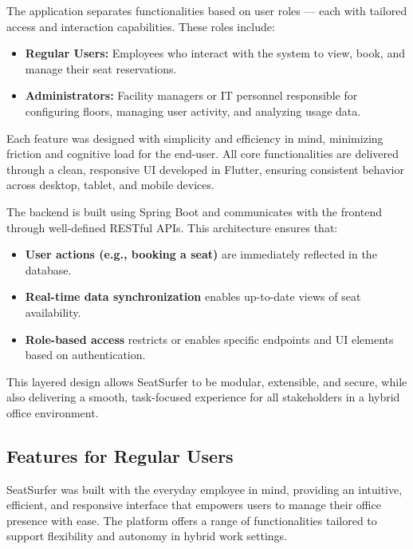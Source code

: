 \documentclass[12pt,a4paper]{report} %
\begin{document}
The application separates functionalities based on user roles — each with tailored access and interaction capabilities. These roles include:

\begin{itemize}
    \item \textbf{Regular Users:} Employees who interact with the system to view, book, and manage their seat reservations.
    \item \textbf{Administrators:} Facility managers or IT personnel responsible for configuring floors, managing user activity, and analyzing usage data.
\end{itemize}

Each feature was designed with simplicity and efficiency in mind, minimizing friction and cognitive load for the end-user. All core functionalities are delivered through a clean, responsive UI developed in Flutter, ensuring consistent behavior across desktop, tablet, and mobile devices.

The backend is built using Spring Boot and communicates with the frontend through well-defined RESTful APIs. This architecture ensures that:

\begin{itemize}
    \item \textbf{User actions (e.g., booking a seat)} are immediately reflected in the database.
    \item \textbf{Real-time data synchronization} enables up-to-date views of seat availability.
    \item \textbf{Role-based access} restricts or enables specific endpoints and UI elements based on authentication.
\end{itemize}

This layered design allows SeatSurfer to be modular, extensible, and secure, while also delivering a smooth, task-focused experience for all stakeholders in a hybrid office environment.

\subsection{Features for Regular Users}

SeatSurfer was built with the everyday employee in mind, providing an intuitive, efficient, and responsive interface that empowers users to manage their office presence with ease. The platform offers a range of functionalities tailored to support flexibility and autonomy in hybrid work settings.
\end{document}
